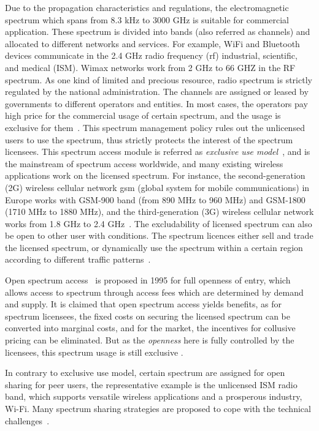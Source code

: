 Due to the propagation characteristics and regulations, the electromagnetic spectrum which spans from 8.3 kHz to 3000 GHz is suitable for commercial application.
These spectrum is divided into bands (also referred as channels) and allocated to different networks and services.
For example, WiFi and Bluetooth devices communicate in the 2.4 GHz radio frequency (\gls{rf}) industrial, scientific, and medical (\gls{ISM}).
Wimax networks work from 2 GHz to 66 GHZ in the RF spectrum.
%
As one kind of limited and precious resource, radio spectrum is strictly regulated by the national administration.
The channels are assigned or leased by governments to different operators and entities.
In most cases, the operators pay high price for the commercial usage of certain spectrum, and the usage is exclusive for them~\cite{Spectrum_Management07}.
This spectrum management policy rules out the unlicensed users to use the spectrum, thus strictly protects the interest of the spectrum licensees.
This spectrum access module is referred as \textit{exclusive use model}~\cite{zhao_survey_DSA_2007}, and is the mainstream of spectrum access worldwide, and many existing wireless applications work on the licensed spectrum.
For instance, the second-generation (2G) wireless cellular network \gls{gsm} (global system for mobile communications) in Europe works with GSM-900 band (from 890 MHz to 960 MHz) and GSM-1800 (1710 MHz to 1880 MHz), and the third-generation (3G) wireless cellular network works from 1.8 GHz to 2.4 GHz~\cite{wireless_communicatioins2001}.
The excludability of licensed spectrum can also be open to other user with conditions.
The spectrum licences either sell and trade the licensed spectrum, or dynamically use the spectrum within a certain region according to different traffic patterns~\cite{dsa_traffic_2000}.

Open spectrum access~\cite{osa_Noam_1995} is proposed in 1995 for full openness of entry, which allows access to spectrum through access fees which are determined by demand and supply.
It is claimed that open spectrum access yields benefits, as for spectrum licensees, the fixed costs on securing the licensed spectrum can be converted into marginal costs, and for the market, the incentives for collusive pricing can be eliminated.
But as the \textit{openness} here is fully controlled by the licensees, this spectrum usage is still exclusive .

%
In contrary to exclusive use model, certain spectrum are assigned for open sharing for peer users, the representative example is the unlicensed ISM radio band, which supports versatile wireless applications and a prosperous industry, \ie Wi-Fi.
Many spectrum sharing strategies are proposed to cope with the technical challenges~\cite{Ko_DistributedCA}.

